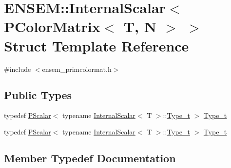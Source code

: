 \hypertarget{structENSEM_1_1InternalScalar_3_01PColorMatrix_3_01T_00_01N_01_4_01_4}{}\section{E\+N\+S\+EM\+:\+:Internal\+Scalar$<$ P\+Color\+Matrix$<$ T, N $>$ $>$ Struct Template Reference}
\label{structENSEM_1_1InternalScalar_3_01PColorMatrix_3_01T_00_01N_01_4_01_4}


{\ttfamily \#include $<$ensem\+\_\+primcolormat.\+h$>$}

\subsection*{Public Types}
\begin{DoxyCompactItemize}
\item 
typedef \mbox{\hyperlink{classENSEM_1_1PScalar}{P\+Scalar}}$<$ typename \mbox{\hyperlink{structENSEM_1_1InternalScalar}{Internal\+Scalar}}$<$ T $>$\+::\mbox{\hyperlink{structENSEM_1_1InternalScalar_3_01PColorMatrix_3_01T_00_01N_01_4_01_4_a9b1738a10ca607ed8d2cee3b7e88d1b1}{Type\+\_\+t}} $>$ \mbox{\hyperlink{structENSEM_1_1InternalScalar_3_01PColorMatrix_3_01T_00_01N_01_4_01_4_a9b1738a10ca607ed8d2cee3b7e88d1b1}{Type\+\_\+t}}
\item 
typedef \mbox{\hyperlink{classENSEM_1_1PScalar}{P\+Scalar}}$<$ typename \mbox{\hyperlink{structENSEM_1_1InternalScalar}{Internal\+Scalar}}$<$ T $>$\+::\mbox{\hyperlink{structENSEM_1_1InternalScalar_3_01PColorMatrix_3_01T_00_01N_01_4_01_4_a9b1738a10ca607ed8d2cee3b7e88d1b1}{Type\+\_\+t}} $>$ \mbox{\hyperlink{structENSEM_1_1InternalScalar_3_01PColorMatrix_3_01T_00_01N_01_4_01_4_a9b1738a10ca607ed8d2cee3b7e88d1b1}{Type\+\_\+t}}
\end{DoxyCompactItemize}


\subsection{Member Typedef Documentation}
\mbox{\label{structENSEM_1_1InternalScalar_3_01PColorMatrix_3_01T_00_01N_01_4_01_4_a9b1738a10ca607ed8d2cee3b7e88d1b1}} 

